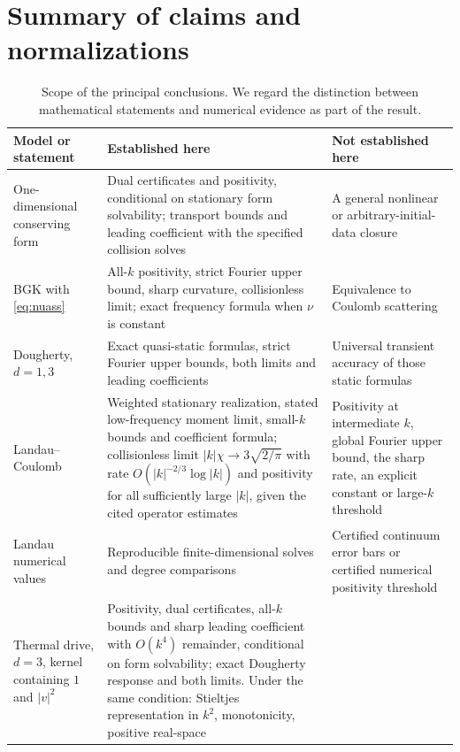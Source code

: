 \documentclass[11pt]{article}
\theoremstyle{definition}
\theoremstyle{remark}
\numberwithin{equation}{section}
\begin{document}
\section{Summary of claims and normalizations}\label{app:ledger}

\begin{table}[ht]
\centering
\caption{Scope of the principal conclusions. We regard the distinction
between mathematical statements and numerical evidence as part of the
result.}
\small
\begin{tabularx}{\textwidth}{@{}>{\raggedright\arraybackslash}p{}
 >{\raggedright\arraybackslash}X>{\raggedright\arraybackslash}X@{}}
\toprule
Model or statement & Established here & Not established here\\
\midrule
One-dimensional conserving form
 & Dual certificates and positivity, conditional on stationary form
solvability; transport bounds and leading coefficient with the
specified collision solves
 & A general nonlinear or arbitrary-initial-data closure\\
\addlinespace
BGK with \eqref{eq:nuass}
 & All-$k$ positivity, strict Fourier upper bound, sharp curvature,
collisionless limit; exact frequency formula when $\nu$ is constant
 & Equivalence to Coulomb scattering\\
\addlinespace
Dougherty, $d=1,3$
 & Exact quasi-static formulas, strict Fourier upper bounds, both
limits and leading coefficients
 & Universal transient accuracy of those static formulas\\
\addlinespace
Landau--Coulomb
 & Weighted stationary realization, stated low-frequency moment limit,
small-$k$ bounds and coefficient formula; collisionless limit
$|k|\chi\to3\sqrt{2/\pi}$ with rate $O(|k|^{-2/3}\log|k|)$ and positivity
for all sufficiently large $|k|$, given the cited operator estimates
 & Positivity at intermediate $k$, global Fourier upper bound, the sharp
rate, an explicit constant or large-$k$ threshold\\
\addlinespace
Landau numerical values
 & Reproducible finite-dimensional solves and degree comparisons
 & Certified continuum error bars or certified numerical positivity threshold\\
\addlinespace
Thermal drive, $d=3$, kernel containing $1$ and $|v|^2$
 & Positivity, dual certificates, all-$k$ bounds and sharp leading
coefficient with $O(k^4)$ remainder, conditional on form solvability;
exact Dougherty response and both limits. Under the same condition:
Stieltjes representation in $k^2$, monotonicity, positive real-space

\end{tabularx}
\end{table}
\end{document}
